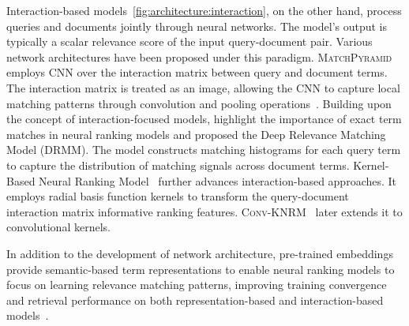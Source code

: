Interaction-based models~\cref{fig:architecture:interaction}, on the other hand, process queries and documents jointly through neural networks. 
The model's output is typically a scalar relevance score of the input query-document pair.
Various network architectures have been proposed under this paradigm. \textsc{MatchPyramid}~\citep{pang2016matchpyramid} employs CNN over the interaction matrix between query and document terms. The interaction matrix is treated as an image, allowing the CNN to capture local matching patterns through convolution and pooling operations~\citep{hu2014convolutional}. 
Building upon the concept of interaction-focused models, \citet{guo2016deep} highlight the importance of exact term matches in neural ranking models and proposed the Deep Relevance Matching Model (\textsc{DRMM}). The model constructs matching histograms for each query term to capture the distribution of matching signals across document terms. 
Kernel-Based Neural Ranking Model~\cite[\textsc{K-NRM,}][]{xiong2017knrm} further advances interaction-based approaches. 
It employs radial basis function kernels to transform the query-document interaction matrix informative ranking features. \textsc{Conv-KNRM}~\citep{dai2018cknrm} later extends it to convolutional kernels.

In addition to the development of network architecture, pre-trained embeddings~\cite{mikolov2013efficient,pennington-etal-2014-glove} provide semantic-based term representations to enable neural ranking models to focus on learning relevance matching patterns, improving training convergence and retrieval performance on both representation-based and interaction-based models~\citep{levy-etal-2015-improving}.

